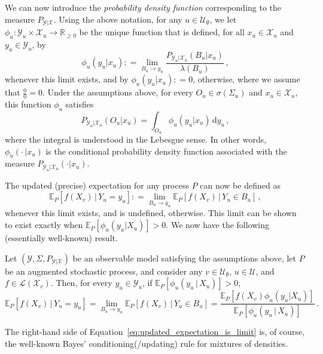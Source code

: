 \documentclass[twoside,11pt]{article}
\newcommand{\reals}{\mathbb{R}}
\newcommand{\realsnonneg}{\reals_{\geq 0}}
\newcommand{\states}{\mathcal{X}}
\newcommand{\observs}{\mathcal{Y}}
\newcommand{\gambles}{\mathcal{L}}
\newcommand{\coloneqq}{:\!=}
\begin{document}
We can now introduce the \emph{probability density function} corresponding to the measure $P_{\observs\vert\states}$. Using the above notation, for any $u\in\mathcal{U}_\emptyset$, we let $\phi_u:\observs_u\times\states_u\to\realsnonneg$ be the unique function that is defined, for all $x_u\in\states_u$ and $y_u\in\observs_u$, by
\begin{equation}\label{eq:density_is_limit}
\phi_u(y_u\vert x_u) \coloneqq \lim_{B_u\to y_u} \frac{P_{\observs_u\vert\states_u}(B_u\vert x_u)}{\lambda(B_u)}\,,
\end{equation}
whenever this limit exists, and by $\phi_u(y_u\vert x_u)\coloneqq 0$, otherwise, where we assume that $\frac{0}{0}=0$. Under the assumptions above, for every $O_u\in\sigma(\Sigma_u)$ and $x_u\in\states_u$, this function $\phi_u$ satisfies
\begin{equation}\label{eq:density_generates_measure}
P_{\observs_u\vert\states_u}(O_u\vert x_u) = \int_{O_u}\phi_u(y_u\vert x_u) \,\mathrm{d}y_u\,,
\end{equation}
where the integral is understood in the Lebesgue sense. In other words, $\phi_u(\cdot\,\vert x_u)$ is the conditional probability density function associated with the measure $P_{\observs_u\vert\states_u}(\cdot\vert x_u)$.

The updated (precise) expectation for any process $P$ can now be defined as
\begin{equation*}
\mathbb{E}_P[f(X_v)\,\vert\,Y_u=y_u] \coloneqq \lim_{B_u\to y_u} \mathbb{E}_P[f(X_v)\,\vert\,Y_u\in B_u]\,,
\end{equation*}
whenever this limit exists, and is undefined, otherwise. This limit can be shown to exist exactly when $\mathbb{E}_P[\phi_u(y_u\vert X_u)]>0$. We now have the following (essentially well-known) result.


\begin{proposition}\label{prop:precise_bayes_rule_densities}
Let $(\observs,\Sigma,P_{\observs\vert\states})$ be an observable model satisfying the assumptions above, let $P$ be an augmented stochastic process, and consider any $v\in\mathcal{U}_\emptyset$, $u\in\mathcal{U}$, and $f\in\gambles(\states_v)$. Then, for every $y_u\in\observs_u$, if $\mathbb{E}_P[\phi_u(y_u\,\vert\,X_u)]>0$,
\begin{equation}\label{eq:updated_expectation_is_limit}
\mathbb{E}_P[f(X_v)\,\vert\,Y_u=y_u] = \lim_{B_u\to y_u} \mathbb{E}_P[f(X_v)\,\vert\,Y_u\in B_u] = \frac{\mathbb{E}_P[f(X_v)\phi_u(y_u\vert X_u)]}{\mathbb{E}_P[\phi_u(y_u\,\vert\,X_u)]}\,.
\end{equation}
\end{proposition}
The right-hand side of Equation~\eqref{eq:updated_expectation_is_limit} is, of course, the well-known Bayes' conditioning(/updating) rule for mixtures of densities. 
\end{document}
